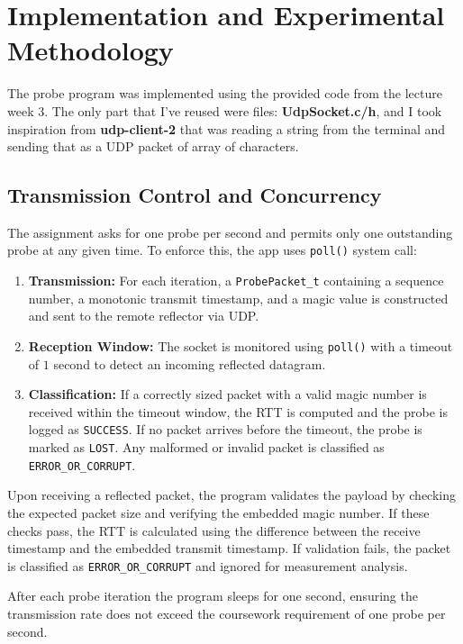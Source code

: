 \section{Implementation and Experimental Methodology}

The probe program was implemented using the provided code from the lecture week 3. The only part that I've reused were files: \textbf{UdpSocket.c/h}, and I took inspiration from \textbf{udp-client-2} that was reading a string from the terminal and sending that as a UDP packet of array of characters.

\subsection{Transmission Control and Concurrency}
The assignment asks for one probe per second and permits only one outstanding probe at any given time. To enforce this, the app uses \texttt{poll()} system call:
\begin{enumerate}
    \item \textbf{Transmission:} For each iteration, a \texttt{ProbePacket\_t} containing a sequence number, a monotonic transmit timestamp, and a magic value is constructed and sent to the remote reflector via UDP.

    \item \textbf{Reception Window:} The socket is monitored using \texttt{poll()} with a timeout of $1$ second to detect an incoming reflected datagram.

    \item \textbf{Classification:} If a correctly sized packet with a valid magic number is received within the timeout window, the RTT is computed and the probe is logged as \texttt{SUCCESS}. If no packet arrives before the timeout, the probe is marked as \texttt{LOST}. Any malformed or invalid packet is classified as \texttt{ERROR\_OR\_CORRUPT}.
\end{enumerate}

Upon receiving a reflected packet, the program validates the payload by checking the expected packet size and verifying the embedded magic number. If these checks pass, the RTT is calculated using the difference between the receive timestamp and the embedded transmit timestamp. If validation fails, the packet is classified as \texttt{ERROR\_OR\_CORRUPT} and ignored for measurement analysis.

After each probe iteration the program sleeps for one second, ensuring the transmission rate does not exceed the coursework requirement of one probe per second.

